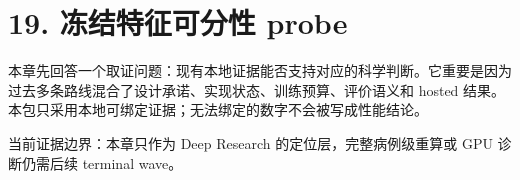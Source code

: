 \section{19. 冻结特征可分性 probe}

本章先回答一个取证问题：现有本地证据能否支持对应的科学判断。它重要是因为过去多条路线混合了设计承诺、实现状态、训练预算、评价语义和 hosted 结果。本包只采用本地可绑定证据；无法绑定的数字不会被写成性能结论。



当前证据边界：本章只作为 Deep Research 的定位层，完整病例级重算或 GPU 诊断仍需后续 terminal wave。



\clearpage